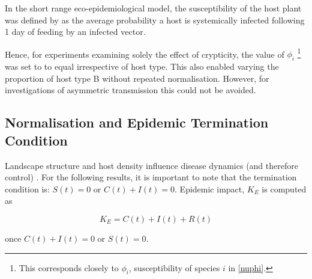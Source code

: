 \documentclass[prstpaper]{revtex4-2}
\begin{document}
In the short range eco-epidemiological model\cite{Bragard2019}, the susceptibility of the host plant was  defined by \cite{Bragard2019} as  the average probability a host is systemically infected following 1 day of feeding by an infected vector. 

Hence, for experiments examining solely the effect of crypticity, the value of $\phi_{i}$ \footnote{This corresponds closely to $\phi_{i}$, susceptibility of species $i$ in \ref{nuphi}.} was set to to equal irrespective of host type. This also enabled varying the proportion of host type B without repeated normalisation. However, for investigations of asymmetric transmission this could not be avoided.

\subsection{Normalisation and Epidemic Termination Condition}
Landscape structure and host density influence disease dynamics (and therefore control) \cite{Parnell2010} \cite{Jerome2021} \cite{Parnell2009}. 
For the following results, it is important to note that the termination condition is: $S(t) = 0$ or $C(t) + I(t) = 0$. Epidemic impact, $K_{E}$ is computed as 

\begin{equation}
    K_{E} = C(t) + I(t) + R(t)
\end{equation}

once $C(t) + I(t) = 0 $ or $ S(t) = 0$. 
\end{document}
